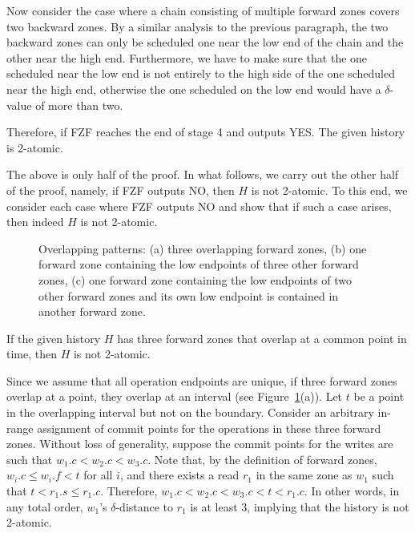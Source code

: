 {Now consider the case where a chain consisting of multiple forward
zones covers two backward zones.  By a similar analysis to the
previous paragraph, the two backward zones can only be scheduled one
near the low end of the chain and the other near the high end.
Furthermore, we have to make sure that the one scheduled near the low
end is not entirely to the high side of the one scheduled near the
high end, otherwise the one scheduled on the low end would have a
$\delta$-value of more than two.

Therefore, if FZF reaches the end of stage 4 and outputs YES.  The
given history is 2-atomic.  \QED

The above is only half of the proof.  In what follows, we carry out
the other half of the proof, namely, if FZF outputs NO, then $H$ is
not 2-atomic.  To this end, we consider each case where FZF outputs NO
and show that if such a case arises, then indeed $H$ is not 2-atomic.

\begin{figure}[tbp]
  \caption{Overlapping patterns: (a) three overlapping forward zones,
    (b) one forward zone containing the low endpoints of three other
    forward zones, (c) one forward zone containing the low endpoints
    of two other forward zones and its own low endpoint is contained
    in another forward zone.}
  \label{fig:overlap}
\end{figure}

\begin{lemma}
  \label{lemma:fzf-overlap-1}
  If the given history $H$ has three forward zones that overlap at a
  common point in time, then $H$ is not 2-atomic.
\end{lemma}

\proof Since we assume that all operation endpoints are unique, if
three forward zones overlap at a point, they overlap at an interval
(see Figure~\ref{fig:overlap}(a)).  Let $t$ be a point in the
overlapping interval but not on the boundary.  Consider an arbitrary
in-range assignment of commit points for the operations in these three
forward zones.  Without loss of generality, suppose the commit points
for the writes are such that $w_1.c < w_2.c < w_3.c$.  Note that, by
the definition of forward zones, $w_i.c \leq w_i.f < t$ for all $i$,
and there exists a read $r_1$ in the same zone as $w_1$ such that $t <
r_1.s \leq r_1.c$.  Therefore, $w_1.c < w_2.c < w_3.c < t < r_1.c$.
In other words, in any total order, $w_1$'s $\delta$-distance to $r_1$
is at least 3, implying that the history is not 2-atomic.  \QED

}
